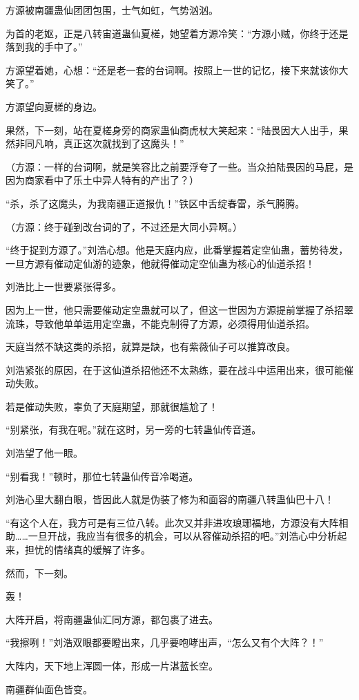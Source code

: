 \begin{this_body}
方源被南疆蛊仙团团包围，士气如虹，气势汹汹。

为首的老妪，正是八转宙道蛊仙夏槎，她望着方源冷笑：“方源小贼，你终于还是落到我的手中了。”

方源望着她，心想：“还是老一套的台词啊。按照上一世的记忆，接下来就该你大笑了。”

方源望向夏槎的身边。

果然，下一刻，站在夏槎身旁的商家蛊仙商虎杖大笑起来：“陆畏因大人出手，果然非同凡响，真正这次就找到了这魔头！”

（方源：一样的台词啊，就是笑容比之前要浮夸了一些。当众拍陆畏因的马屁，是因为商家看中了乐土中异人特有的产出了？）

“杀，杀了这魔头，为我南疆正道报仇！”铁区中舌绽春雷，杀气腾腾。

（方源：终于碰到改台词的了，不过还是大同小异啊。）

“终于捉到方源了。”刘浩心想。他是天庭内应，此番掌握着定空仙蛊，蓄势待发，一旦方源有催动定仙游的迹象，他就得催动定空仙蛊为核心的仙道杀招！

刘浩比上一世要紧张得多。

因为上一世，他只需要催动定空蛊就可以了，但这一世因为方源提前掌握了杀招翠流珠，导致他单单运用定空蛊，不能克制得了方源，必须得用仙道杀招。

天庭当然不缺这类的杀招，就算是缺，也有紫薇仙子可以推算改良。

刘浩紧张的原因，在于这仙道杀招他还不太熟练，要在战斗中运用出来，很可能催动失败。

若是催动失败，辜负了天庭期望，那就很尴尬了！

“别紧张，有我在呢。”就在这时，另一旁的七转蛊仙传音道。

刘浩望了他一眼。

“别看我！”顿时，那位七转蛊仙传音冷喝道。

刘浩心里大翻白眼，皆因此人就是伪装了修为和面容的南疆八转蛊仙巴十八！

“有这个人在，我方可是有三位八转。此次又并非进攻琅琊福地，方源没有大阵相助……一旦开战，我应当有很多的机会，可以从容催动杀招的吧。”刘浩心中分析起来，担忧的情绪真的缓解了许多。

然而，下一刻。

轰！

大阵开启，将南疆蛊仙汇同方源，都包裹了进去。

“我擦咧！”刘浩双眼都要瞪出来，几乎要咆哮出声，“怎么又有个大阵？！”

大阵内，天下地上浑圆一体，形成一片湛蓝长空。

南疆群仙面色皆变。


\end{this_body}
